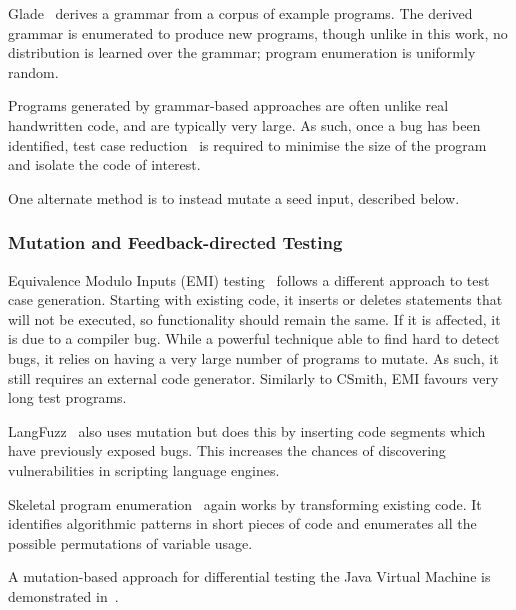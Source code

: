 Glade~\cite{Bastani2017} derives a grammar from a corpus of example programs. The derived grammar is enumerated to produce new programs, though unlike in this work, no distribution is learned over the grammar; program enumeration is uniformly random.

Programs generated by grammar-based approaches are often unlike real handwritten code, and are typically very large. As such, once a bug has been identified, test case reduction~\cite{Regehr2012a} is required to minimise the size of the program and isolate the code of interest.

One alternate method is to instead mutate a seed input, described below.


\subsubsection{Mutation and Feedback-directed Testing}


Equivalence Modulo Inputs (EMI) testing~\cite{Le2013a,Sun2016a} follows a different approach to test case generation. Starting with existing code, it inserts or deletes statements that will not be executed, so functionality should remain the same. If it is affected, it is due to a compiler bug. While a powerful technique able to find hard to detect bugs, it relies on having a very large number of programs to mutate. As such, it still requires an external code generator. Similarly to CSmith, EMI favours very long test programs.

LangFuzz~\cite{Holler2012} also uses mutation but does this by inserting code segments which have previously exposed bugs. This increases the chances of discovering vulnerabilities in scripting language engines.

Skeletal program enumeration~\cite{Zhang2017a} again works by transforming existing code. It identifies algorithmic patterns in short pieces of code and enumerates all the possible permutations of variable usage.

A mutation-based approach for differential testing the Java Virtual Machine is demonstrated in~\cite{Chena}.


